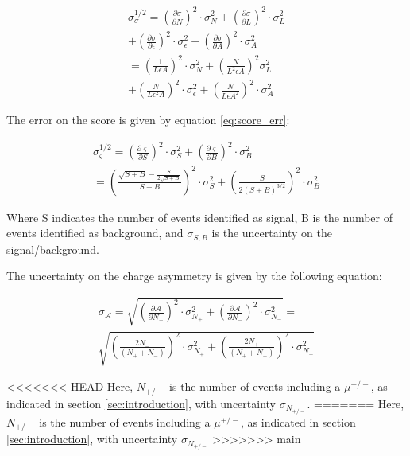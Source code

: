 \documentclass[%
 reprint,
 amsmath,amssymb,
 aps,
]{revtex4-2}
\begin{document}
\begin{multline}\label{eq:cross_sec_err}
    \sigma_{\sigma}^{1/2} = \left(\frac{\partial \sigma}{\partial N}\right)^2 \cdot \sigma_N^2 + \left(\frac{\partial \sigma}{\partial L}\right)^2 \cdot \sigma_L^2 \\
    + \left(\frac{\partial \sigma}{\partial \epsilon}\right)^2 \cdot \sigma_{\epsilon}^2 + \left(\frac{\partial \sigma}{\partial A}\right)^2 \cdot \sigma_A^2 \\
    = \left(\frac{1}{L \epsilon A}\right)^2 \cdot \sigma_N^2 + \left(\frac{N}{L^2 \epsilon A}\right)^2 \sigma_L^2 \\
    + \left(\frac{N}{L \epsilon^2 A}\right)^2 \cdot \sigma_{\epsilon}^2 + \left(\frac{N}{L \epsilon A^2}\right)^2 \cdot \sigma_A^2
\end{multline}


The error on the score is given by equation \ref{eq:score_err}:

\begin{multline}\label{eq:score_err}
    \sigma_{\varsigma}^{1/2} = \left(\frac{\partial \varsigma}{\partial S}\right)^2 \cdot \sigma_S^2 + \left(\frac{\partial \varsigma}{\partial B}\right)^2 \cdot \sigma_B^2 \\
    = \left(\frac{\sqrt{S + B} - \frac{S}{2\sqrt{S+B}}}{S + B }\right)^2 \cdot \sigma_S^2 + \left(\frac{S}{2 \left(S+B\right)^{3/2}}\right)^2 \cdot \sigma_B^2
\end{multline}

Where S indicates the number of events identified as signal, B is the number of events identified as background, and $\sigma_{S,B}$ is the uncertainty on the signal/background.

The uncertainty on the charge asymmetry is given by the following equation:

\begin{multline}\label{eq:charge_asym_err}
    \sigma_{\mathcal{A}} = \sqrt{
    \left(\frac{\partial \mathcal{A}}{\partial N_+}\right)^2 \cdot \sigma_{N_+}^2 + \left(\frac{\partial \mathcal{A}}{\partial N_-}\right)^2 \cdot \sigma_{N_-}^2
    } 
    = \\ 
    \sqrt{
    \left(\frac{2 N_-}{\left(N_+ + N_- \right)}\right)^2 \cdot \sigma_{N_+}^2 + \left(\frac{2 N_+}{\left(N_+ + N_- \right)}\right)^2 \cdot \sigma_{N_-}^2
    } 
\end{multline}

<<<<<<< HEAD
Here, $N_{+/-}$ is the number of events including a $\mu^{+/-}$, as indicated in section \ref{sec:introduction}, with uncertainty $\sigma_{N_{+/-}}$.
=======
Here, $N_{+/-}$ is the number of events including a $\mu^{+/-}$, as indicated in section \ref{sec:introduction}, with uncertainty $\sigma_{N_{+/-}}$
>>>>>>> main




\end{document}
